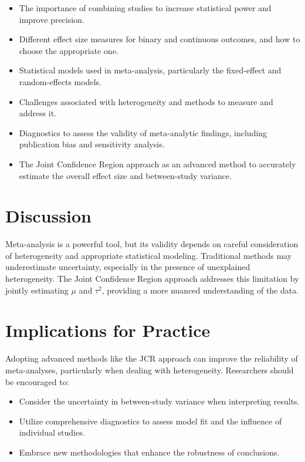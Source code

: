 \documentclass[12pt,a4paper]{report}
\begin{document}
\begin{itemize}
    \item The importance of combining studies to increase statistical power and improve precision.
    \item Different effect size measures for binary and continuous outcomes, and how to choose the appropriate one.
    \item Statistical models used in meta-analysis, particularly the fixed-effect and random-effects models.
    \item Challenges associated with heterogeneity and methods to measure and address it.
    \item Diagnostics to assess the validity of meta-analytic findings, including publication bias and sensitivity analysis.
    \item The Joint Confidence Region approach as an advanced method to accurately estimate the overall effect size and between-study variance.
\end{itemize}

\section{Discussion}
\label{sec:discussion}

Meta-analysis is a powerful tool, but its validity depends on careful consideration of heterogeneity and appropriate statistical modeling. Traditional methods may underestimate uncertainty, especially in the presence of unexplained heterogeneity. The Joint Confidence Region approach addresses this limitation by jointly estimating $\mu$ and $\tau^2$, providing a more nuanced understanding of the data.

\section{Implications for Practice}
\label{sec:implications}

Adopting advanced methods like the JCR approach can improve the reliability of meta-analyses, particularly when dealing with heterogeneity. Researchers should be encouraged to:

\begin{itemize}
    \item Consider the uncertainty in between-study variance when interpreting results.
    \item Utilize comprehensive diagnostics to assess model fit and the influence of individual studies.
    \item Embrace new methodologies that enhance the robustness of conclusions.
\end{itemize}
\end{document}
